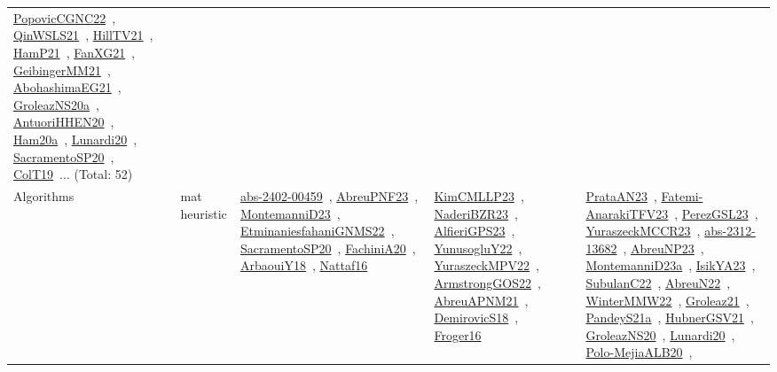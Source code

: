 {\begin{longtable}{lp{3cm}>{\raggedright\arraybackslash}p{6cm}>{\raggedright\arraybackslash}p{6cm}>{\raggedright\arraybackslash}p{8cm}}
\href{../works/PopovicCGNC22.pdf}{PopovicCGNC22}~\cite{PopovicCGNC22}, \href{../works/QinWSLS21.pdf}{QinWSLS21}~\cite{QinWSLS21}, \href{../works/HillTV21.pdf}{HillTV21}~\cite{HillTV21}, \href{../works/HamP21.pdf}{HamP21}~\cite{HamP21}, \href{../works/FanXG21.pdf}{FanXG21}~\cite{FanXG21}, \href{../works/GeibingerMM21.pdf}{GeibingerMM21}~\cite{GeibingerMM21}, \href{../works/AbohashimaEG21.pdf}{AbohashimaEG21}~\cite{AbohashimaEG21}, \href{../works/GroleazNS20a.pdf}{GroleazNS20a}~\cite{GroleazNS20a}, \href{../works/AntuoriHHEN20.pdf}{AntuoriHHEN20}~\cite{AntuoriHHEN20}, \href{../works/Ham20a.pdf}{Ham20a}~\cite{Ham20a}, \href{../works/Lunardi20.pdf}{Lunardi20}~\cite{Lunardi20}, \href{../works/SacramentoSP20.pdf}{SacramentoSP20}~\cite{SacramentoSP20}, \href{../works/ColT19.pdf}{ColT19}~\cite{ColT19}... (Total: 52)\\
Algorithms & mat heuristic & \href{../works/abs-2402-00459.pdf}{abs-2402-00459}~\cite{abs-2402-00459}, \href{../works/AbreuPNF23.pdf}{AbreuPNF23}~\cite{AbreuPNF23}, \href{../works/MontemanniD23.pdf}{MontemanniD23}~\cite{MontemanniD23}, \href{../works/EtminaniesfahaniGNMS22.pdf}{EtminaniesfahaniGNMS22}~\cite{EtminaniesfahaniGNMS22}, \href{../works/SacramentoSP20.pdf}{SacramentoSP20}~\cite{SacramentoSP20}, \href{../works/FachiniA20.pdf}{FachiniA20}~\cite{FachiniA20}, \href{../works/ArbaouiY18.pdf}{ArbaouiY18}~\cite{ArbaouiY18}, \href{../works/Nattaf16.pdf}{Nattaf16}~\cite{Nattaf16} & \href{../works/KimCMLLP23.pdf}{KimCMLLP23}~\cite{KimCMLLP23}, \href{../works/NaderiBZR23.pdf}{NaderiBZR23}~\cite{NaderiBZR23}, \href{../works/AlfieriGPS23.pdf}{AlfieriGPS23}~\cite{AlfieriGPS23}, \href{../works/YunusogluY22.pdf}{YunusogluY22}~\cite{YunusogluY22}, \href{../works/YuraszeckMPV22.pdf}{YuraszeckMPV22}~\cite{YuraszeckMPV22}, \href{../works/ArmstrongGOS22.pdf}{ArmstrongGOS22}~\cite{ArmstrongGOS22}, \href{../works/AbreuAPNM21.pdf}{AbreuAPNM21}~\cite{AbreuAPNM21}, \href{../works/DemirovicS18.pdf}{DemirovicS18}~\cite{DemirovicS18}, \href{../works/Froger16.pdf}{Froger16}~\cite{Froger16} & \href{../works/PrataAN23.pdf}{PrataAN23}~\cite{PrataAN23}, \href{../works/Fatemi-AnarakiTFV23.pdf}{Fatemi-AnarakiTFV23}~\cite{Fatemi-AnarakiTFV23}, \href{../works/PerezGSL23.pdf}{PerezGSL23}~\cite{PerezGSL23}, \href{../works/YuraszeckMCCR23.pdf}{YuraszeckMCCR23}~\cite{YuraszeckMCCR23}, \href{../works/abs-2312-13682.pdf}{abs-2312-13682}~\cite{abs-2312-13682}, \href{../works/AbreuNP23.pdf}{AbreuNP23}~\cite{AbreuNP23}, \href{../works/MontemanniD23a.pdf}{MontemanniD23a}~\cite{MontemanniD23a}, \href{../works/IsikYA23.pdf}{IsikYA23}~\cite{IsikYA23}, \href{../works/SubulanC22.pdf}{SubulanC22}~\cite{SubulanC22}, \href{../works/AbreuN22.pdf}{AbreuN22}~\cite{AbreuN22}, \href{../works/WinterMMW22.pdf}{WinterMMW22}~\cite{WinterMMW22}, \href{../works/Groleaz21.pdf}{Groleaz21}~\cite{Groleaz21}, \href{../works/PandeyS21a.pdf}{PandeyS21a}~\cite{PandeyS21a}, \href{../works/HubnerGSV21.pdf}{HubnerGSV21}~\cite{HubnerGSV21}, \href{../works/GroleazNS20.pdf}{GroleazNS20}~\cite{GroleazNS20}, \href{../works/Lunardi20.pdf}{Lunardi20}~\cite{Lunardi20}, \href{../works/Polo-MejiaALB20.pdf}{Polo-MejiaALB20}~\cite{Polo-MejiaALB20}, 
\end{longtable}}

